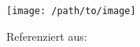 \documentclass{article}
\begin{document}
    \begin{figure}
        \centering
        \texttt{[image: /path/to/image]}
        \caption{Referenziert aus: \cite[modifiziert]{9gagBear}} %
    \end{figure}


    
\end{document}
